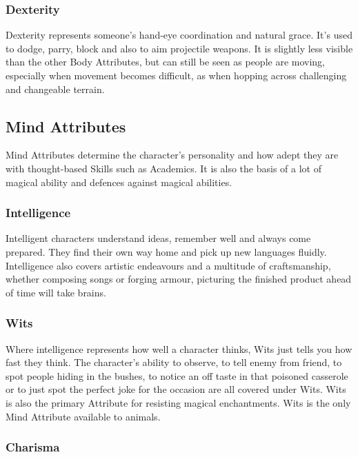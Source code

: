 \begin{multicols}{2}
\subsubsection{Dexterity}

Dexterity represents someone's hand-eye coordination and natural grace. It's used to dodge, parry, block and also to aim projectile weapons. It is slightly less visible than the other Body Attributes, but can still be seen as people are moving, especially when movement becomes difficult, as when hopping across challenging and changeable terrain.

\subsection{Mind Attributes}

Mind Attributes determine the character's personality and how adept they are with thought-based Skills such as Academics. It is also the basis of a lot of magical ability and defences against magical abilities.

\subsubsection{Intelligence}

Intelligent characters understand ideas, remember well and always come prepared. They find their own way home and pick up new languages fluidly. Intelligence also covers artistic endeavours and a multitude of craftsmanship, whether composing songs or forging armour, picturing the finished product ahead of time will take brains.

\subsubsection{Wits}

Where intelligence represents how well a character thinks, Wits just tells you how fast they think. The character's ability to observe, to tell enemy from friend, to spot people hiding in the bushes, to notice an off taste in that poisoned casserole or to just spot the perfect joke for the occasion are all covered under Wits. Wits is also the primary Attribute for resisting magical enchantments. Wits is the only Mind Attribute available to animals.

\subsubsection{Charisma}


\end{multicols}
